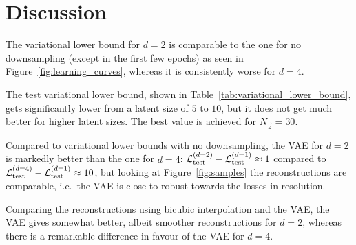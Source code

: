 \section{Discussion}
\label{sec:discussion}

The variational lower bound for $d = 2$ is comparable to the one for no downsampling (except in the first few epochs) as seen in Figure~\ref{fig:learning_curves}, whereas it is consistently worse for $d = 4$.

The test variational lower bound, shown in Table~\ref{tab:variational_lower_bound}, gets significantly lower from a latent size of $5$ to $10$, but it does not get much better for higher latent sizes. The best value is achieved for $N_{\vec{z}} = 30$.

Compared to variational lower bounds with no downsampling, the VAE for $d = 2$ is markedly better than the one for $d = 4$: $\mathcal{L}_{\text{test}}^{(d = 2)} - \mathcal{L}_{\text{test}}^{(d = 1)} \approx 1$ compared to $\mathcal{L}_{\text{test}}^{(d = 4)} - \mathcal{L}_{\text{test}}^{(d = 1)} \approx 10$, but looking at Figure~\ref{fig:samples} the reconstructions are comparable, i.e.\ the VAE is close to robust towards the losses in resolution.

Comparing the reconstructions using bicubic interpolation and the VAE, the VAE gives somewhat better, albeit smoother reconstructions for $d = 2$, whereas there is a remarkable difference in favour of the VAE for $d = 4$.
